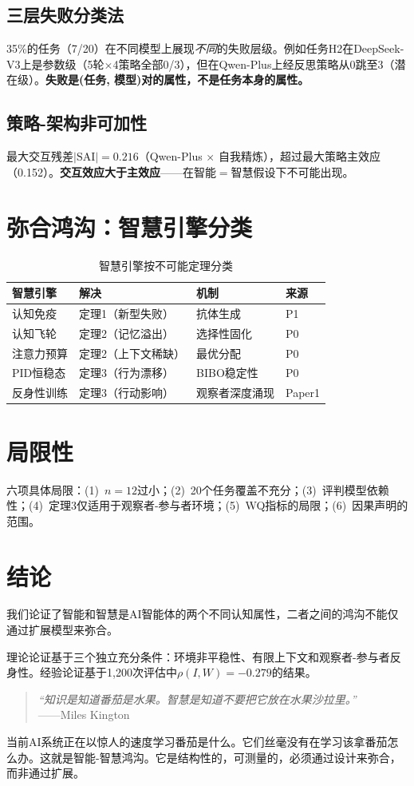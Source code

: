 \documentclass[11pt,a4paper]{article}
\begin{document}
\subsection{三层失败分类法}

35\%的任务（7/20）在不同模型上展现\emph{不同}的失败层级。例如任务H2在DeepSeek-V3上是参数级（5轮$\times$4策略全部0/3），但在Qwen-Plus上经反思策略从0跳至3（潜在级）。\textbf{失败是(任务, 模型)对的属性，不是任务本身的属性。}

\subsection{策略-架构非可加性}

最大交互残差$|\text{SAI}| = 0.216$（Qwen-Plus $\times$ 自我精炼），超过最大策略主效应（0.152）。\textbf{交互效应大于主效应}——在智能$=$智慧假设下不可能出现。

\section{弥合鸿沟：智慧引擎分类}
\label{sec:engines}

\begin{table}[h]
\centering
\caption{智慧引擎按不可能定理分类}
\begin{tabular}{@{}llll@{}}
\toprule
\textbf{智慧引擎} & \textbf{解决} & \textbf{机制} & \textbf{来源} \\
\midrule
认知免疫 & 定理1（新型失败） & 抗体生成 & P1 \\
认知飞轮 & 定理2（记忆溢出） & 选择性固化 & P0 \\
注意力预算 & 定理2（上下文稀缺） & 最优分配 & P0 \\
PID恒稳态 & 定理3（行为漂移） & BIBO稳定性 & P0 \\
反身性训练 & 定理3（行动影响） & 观察者深度涌现 & Paper1 \\
\bottomrule
\end{tabular}
\end{table}

\section{局限性}

六项具体局限：(1)~$n=12$过小；(2)~20个任务覆盖不充分；(3)~评判模型依赖性；(4)~定理3仅适用于观察者-参与者环境；(5)~WQ指标的局限；(6)~因果声明的范围。

\section{结论}

我们论证了智能和智慧是AI智能体的两个不同认知属性，二者之间的鸿沟不能仅通过扩展模型来弥合。

理论论证基于三个独立充分条件：环境非平稳性、有限上下文和观察者-参与者反身性。经验论证基于1,200次评估中$\rho(I, W) = -0.279$的结果。

\begin{quote}
\textit{``知识是知道番茄是水果。智慧是知道不要把它放在水果沙拉里。''}\\
——Miles Kington
\end{quote}

当前AI系统正在以惊人的速度学习番茄是什么。它们丝毫没有在学习该拿番茄怎么办。这就是智能-智慧鸿沟。它是结构性的，可测量的，必须通过设计来弥合，而非通过扩展。
\end{document}
